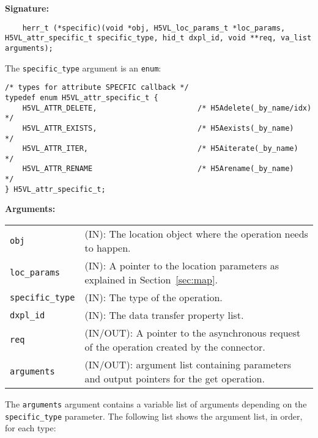 \begin{mdframed}[style=bgbox]
\textbf{Signature:}
\begin{lstlisting}
	herr_t (*specific)(void *obj, H5VL_loc_params_t *loc_params, H5VL_attr_specific_t specific_type, hid_t dxpl_id, void **req, va_list arguments);
\end{lstlisting}

The \texttt{specific\_type} argument is an \texttt{enum}:
\begin{lstlisting}
/* types for attribute SPECFIC callback */
typedef enum H5VL_attr_specific_t {                                              
    H5VL_ATTR_DELETE,                       /* H5Adelete(_by_name/idx)             */
    H5VL_ATTR_EXISTS,                       /* H5Aexists(_by_name)                 */
    H5VL_ATTR_ITER,                         /* H5Aiterate(_by_name)                */
    H5VL_ATTR_RENAME                        /* H5Arename(_by_name)                 */
} H5VL_attr_specific_t; 
\end{lstlisting}

\textbf{Arguments:}\\
\begin{tabular}{l p{13.5cm}}
  \texttt{obj} & (IN): The location object  where the operation needs to happen.\\
  \texttt{loc\_params} & (IN): A pointer to the location parameters as explained in Section~\ref{sec:map}.\\
  \texttt{specific\_type} & (IN): The type of the operation.\\
  \texttt{dxpl\_id} & (IN): The data transfer property list.\\
  \texttt{req} & (IN/OUT): A pointer to the asynchronous request of the
  operation created by the connector.\\
  \texttt{arguments} & (IN/OUT): argument list containing parameters and
  output pointers for the get operation. \\
\end{tabular}
\end{mdframed}

The \texttt{arguments} argument contains a variable list of arguments
depending on the \texttt{specific\_type} parameter. The following list shows
the argument list, in order, for each type:

